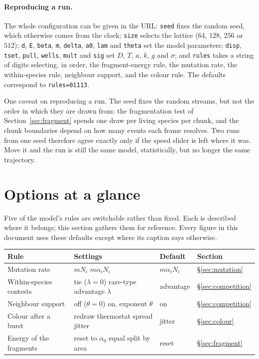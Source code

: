 \documentclass[11pt,a4paper]{article}
\newcommand{\code}[1]{\texttt{#1}}
\begin{document}
\paragraph{Reproducing a run.} The whole configuration can be given in the URL:
\code{seed} fixes the random seed, which otherwise comes from the clock;
\code{size} selects the lattice ($64$, $128$, $256$ or $512$);
\code{d}, \code{E}, \code{beta}, \code{m}, \code{delta}, \code{a0}, \code{lam} and
\code{theta} set the model parameters;
\code{disp}, \code{tset}, \code{pull}, \code{wells}, \code{mult} and \code{sig} set
$D$, $T$, $a$, $k$, $g$ and $\sigma$;
and \code{rules} takes a string of digits selecting, in order, the fragment-energy rule,
the mutation rate, the within-species rule, neighbour support, and the colour rule. The
defaults correspond to \code{rules=01113}.

One caveat on reproducing a run. The seed fixes the random streams, but not the order in
which they are drawn from: the fragmentation test of Section~\ref{sec:fragment} spends one
draw per living species per chunk, and the chunk boundaries depend on how many events each
frame resolves. Two runs from one seed therefore agree exactly only if the speed slider is
left where it was. Move it and the run is still the same model, statistically, but no longer
the same trajectory.

\section{Options at a glance}
\label{sec:options}

Five of the model's rules are switchable rather than fixed. Each is described where it
belongs; this section gathers them for reference. Every figure in this document uses
these defaults except where its caption says otherwise.

\begin{center}
\begin{tabular}{llll}
\toprule
Rule & Settings & Default & Section \\
\midrule
Mutation rate & $m N_i$ \textbar{} $m \alpha_i N_i$
  & $m \alpha_i N_i$ & \S\ref{sec:mutation} \\
Within-species contests & tie ($\lambda = 0$) \textbar{} rare-type advantage $\lambda$
  & advantage & \S\ref{sec:competition} \\
Neighbour support & off ($\theta = 0$) \textbar{} on, exponent $\theta$
  & on & \S\ref{sec:competition} \\
Colour after a burst & redraw \textbar{} thermostat \textbar{} spread \textbar{} jitter
  & jitter & \S\ref{sec:colour} \\
Energy of the fragments & reset to $\alpha_0$ \textbar{} equal split \textbar{} by area
  & reset & \S\ref{sec:fragment} \\
\bottomrule
\end{tabular}
\end{center}
\end{document}
